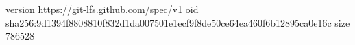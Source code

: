 version https://git-lfs.github.com/spec/v1
oid sha256:9d1394f8808810f832d1da007501e1ecf9f8de50ce64ea460f6b12895ca0e16c
size 786528
